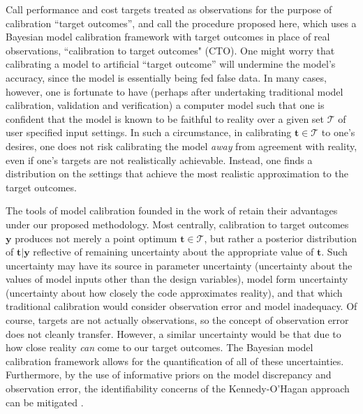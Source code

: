 \documentclass[12pt]{article}
\begin{document}
%
Call performance and cost targets treated as observations for the purpose of calibration ``target outcomes'', and call the procedure proposed here, which uses a Bayesian model calibration framework with target outcomes in place of real observations, ``calibration to target outcomes" (CTO). 
%
One might worry that calibrating a model to artificial ``target outcome'' will undermine the model's accuracy, since the model is essentially being fed false data.
%
%
In many cases, however, one is fortunate to have (perhaps after undertaking traditional model calibration, validation and verification) a computer model such that one is confident that the model is known to be faithful to reality over a given set $\mathcal T$ of user specified input settings.
%
In such a circumstance, in calibrating $\mathbf t\in\mathcal T$ to one's desires, one does not risk calibrating the model \emph{away} from agreement with reality, even if one's targets are not realistically achievable. 
%
Instead, one finds a distribution on the settings that achieve the most realistic approximation to the target outcomes.

The tools of model calibration founded in the work of \cite{Kennedy2001} retain their advantages under our proposed methodology.
%
Most centrally, calibration to target outcomes $\mathbf y$ produces not merely a point optimum $\mathbf t\in\mathcal T$, but rather a posterior distribution of $\mathbf t|\mathbf y$ reflective of remaining uncertainty about the appropriate value of $\mathbf t$. 
%
Such uncertainty may have its source in parameter uncertainty (uncertainty about the values of model inputs other than the design variables), model form uncertainty (uncertainty about how closely the code approximates reality), and that which traditional calibration would consider observation error and model inadequacy. 
%
Of course,  targets are not actually observations, so the concept of observation error does not cleanly transfer. 
%
However, a similar uncertainty would be that due to how close reality \emph{can} come to our target outcomes. 
%
The Bayesian model calibration framework allows for the quantification of all of these uncertainties. 
%
Furthermore, by the use of informative priors on the model discrepancy and observation error, the identifiability concerns of the Kennedy-O'Hagan approach can be mitigated \citep{Bayarri2007,Tuo2016}.
\end{document}
